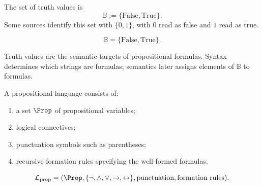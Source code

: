 \begin{tcolorbox}[colback=propbox, colframe=propborder, arc=2pt,
  left=6pt, right=6pt, top=4pt, bottom=4pt,
  title={\small\textbf{Definition (Truth Value)}},
  fonttitle=\small\bfseries]
\begin{definition}
\label{def:truth-value-propositional-logic}
The set of truth values is
\[
\mathbb{B} := \{\mathrm{False},\mathrm{True}\}.
\]
Some sources identify this set with \(\{0,1\}\), with \(0\) read as false and \(1\) read as true.
\end{definition}
\end{tcolorbox}

\begin{remark*}
\[
\mathbb{B}=\{\mathrm{False},\mathrm{True}\}.
\]
\end{remark*}

\begin{remark*}[Interpretation]
Truth values are the semantic targets of propositional formulas. Syntax determines which strings are formulas; semantics later assigns elements of \(\mathbb{B}\) to formulas.
\end{remark*}

\begin{dependencies}
\NoLocalDependencies
\end{dependencies}
\begin{tcolorbox}[colback=propbox, colframe=propborder, arc=2pt,
  left=6pt, right=6pt, top=4pt, bottom=4pt,
  title={\small\textbf{Definition (Propositional Language)}},
  fonttitle=\small\bfseries]
\begin{definition}
\label{def:propositional-language}
A propositional language consists of:
\begin{enumerate}
\item a set \(\Prop\) of propositional variables;
\item logical connectives;
\item punctuation symbols such as parentheses;
\item recursive formation rules specifying the well-formed formulas.
\end{enumerate}
\end{definition}
\end{tcolorbox}

\begin{remark*}
\[
\mathcal L_{\mathrm{prop}}
=
(\Prop,\{\neg,\land,\lor,\to,\leftrightarrow\},\text{punctuation},\text{formation rules}).
\]
\end{remark*}

